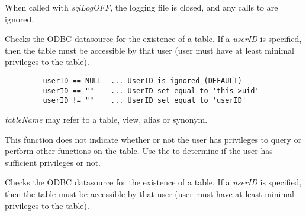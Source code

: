 When called with {\it sqlLogOFF}, the logging file is closed, and any calls to  are ignored.


\label{wxdbtableexists}


Checks the ODBC datasource for the existence of a table.  If a {\it userID} 
is specified, then the table must be accessible by that user (user must have 
at least minimal privileges to the table).



\begin{verbatim}
         userID == NULL  ... UserID is ignored (DEFAULT)
         userID == ""    ... UserID set equal to 'this->uid'
         userID != ""    ... UserID set equal to 'userID'
\end{verbatim}


{\it tableName} may refer to a table, view, alias or synonym.

This function does not indicate whether or not the user has privileges to query or perform other functions on the table.  Use the  to determine if the user has sufficient privileges or not.




\label{wxdbtableprivileges}


Checks the ODBC datasource for the existence of a table.  If a {\it userID} 
is specified, then the table must be accessible by that user (user must have 
at least minimal privileges to the table).

